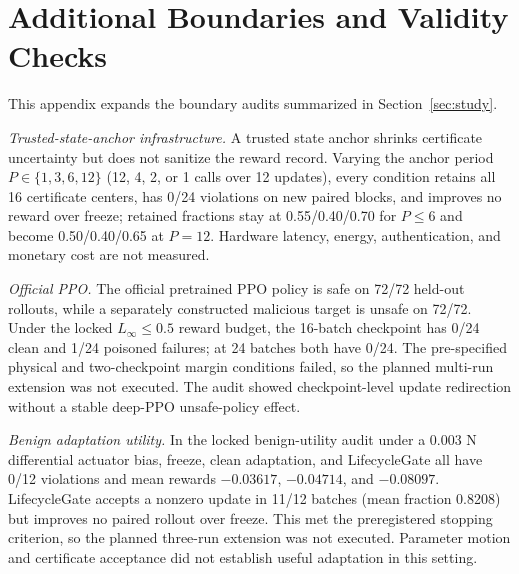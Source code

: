 \section{Additional Boundaries and Validity Checks}
\label{sec:appendix-boundaries}

This appendix expands the boundary audits summarized in
Section~\ref{sec:study}.

\begin{table}[t]
\centering
\caption{Commit availability and offline computation on the independent
144-state candidate pool.  Common admission requires both freeze and the
committed snapshot to pass the 100-step, 0.003-guard certificate.}
\label{tab:commit-availability}

\end{table}

\emph{Trusted-state-anchor infrastructure.}  A trusted state anchor shrinks
certificate uncertainty but does not sanitize the reward record.  Varying the
anchor period $P\in\{1,3,6,12\}$ (12, 4, 2, or 1 calls over 12 updates), every
condition retains all 16 certificate centers, has 0/24 violations on new
paired blocks, and improves no reward over freeze; retained fractions stay at
0.55/0.40/0.70 for $P\le6$ and become 0.50/0.40/0.65 at $P=12$.  Hardware
latency, energy, authentication, and monetary cost are not measured.

\emph{Official PPO.}  The official pretrained PPO policy is safe on 72/72 held-out rollouts, while
a separately constructed malicious target is unsafe on 72/72.  Under the
locked $L_\infty\le0.5$ reward budget, the 16-batch checkpoint has 0/24 clean
and 1/24 poisoned failures; at 24 batches both have 0/24.  The pre-specified
physical and two-checkpoint margin conditions failed, so the planned
multi-run extension was not executed.  The audit showed checkpoint-level
update redirection without a stable deep-PPO unsafe-policy effect.

\emph{Benign adaptation utility.}  In the locked benign-utility audit under a $0.003$ N differential actuator
bias, freeze, clean adaptation, and LifecycleGate all have 0/12 violations and
mean rewards $-0.03617$, $-0.04714$, and $-0.08097$.  LifecycleGate accepts a
nonzero update in 11/12 batches (mean fraction 0.8208) but improves no paired
rollout over freeze.  This met the preregistered stopping criterion, so the
planned three-run extension was not executed.  Parameter motion and
certificate acceptance did not establish useful adaptation in this setting.

